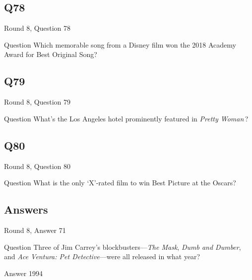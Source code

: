 \documentclass[11pt]{beamer}
\begin{document}
\subsection*{Q78}
\begin{frame}[t]{Round 8, Question 78}
\vspace{2em}
\begin{block}{Question}
Which memorable song from a Disney film won the 2018 Academy Award for Best Original Song?
\end{block}
\end{frame}
    

\subsection*{Q79}
\begin{frame}[t]{Round 8, Question 79}
\vspace{2em}
\begin{block}{Question}
What's the Los Angeles hotel prominently featured in \emph{Pretty Woman}\,?
\end{block}
\end{frame}
    

\subsection*{Q80}
\begin{frame}[t]{Round 8, Question 80}
\vspace{2em}
\begin{block}{Question}
What is the only `X'-rated film to win Best Picture at the Oscars?
\end{block}
\end{frame}
    
\subsection{Answers}

\begin{frame}[t]{Round 8, Answer 71}
\vspace{2em}
\begin{block}{Question}
Three of Jim Carrey's blockbusters—\emph{The Mask}, \emph{Dumb and Dumber}, and \emph{Ace Ventura: Pet Detective}—were all released in what year?
\end{block}
\pause{}
\begin{block}{Answer}
1994
\end{block}
\end{frame}
    
\end{document}
